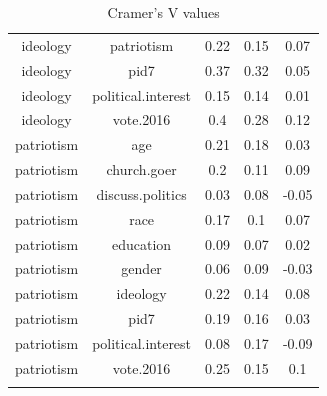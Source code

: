 \documentclass[11pt]{article}
\begin{document}
\begin{table}[!htbp]
\begin{tabular}{@{\extracolsep{5pt}} ccccc}
ideology & patriotism & 0.22 & 0.15 & 0.07 \\
ideology & pid7 & 0.37 & 0.32 & 0.05 \\
ideology & political.interest & 0.15 & 0.14 & 0.01 \\
ideology & vote.2016 & 0.4 & 0.28 & 0.12 \\
patriotism & age & 0.21 & 0.18 & 0.03 \\
patriotism & church.goer & 0.2 & 0.11 & 0.09 \\
patriotism & discuss.politics & 0.03 & 0.08 & -0.05 \\
patriotism & race & 0.17 & 0.1 & 0.07 \\
patriotism & education & 0.09 & 0.07 & 0.02 \\
patriotism & gender & 0.06 & 0.09 & -0.03 \\
patriotism & ideology & 0.22 & 0.14 & 0.08 \\
patriotism & pid7 & 0.19 & 0.16 & 0.03 \\
patriotism & political.interest & 0.08 & 0.17 & -0.09 \\
patriotism & vote.2016 & 0.25 & 0.15 & 0.1 \\

\bottomrule{}
\end{tabular}
  \caption{Cramer's V values}
  \label{tab:cramersvnumbers2}
\end{table}
\end{document}
